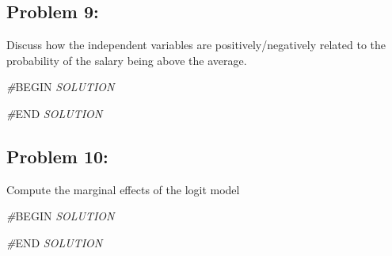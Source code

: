 \documentclass[
]{article}
\newenvironment{Shaded}{\begin{snugshade}}{\end{snugshade}}
\newcommand{\CommentTok}[1]{\textcolor[rgb]{0.56,0.35,0.01}{\textit{#1}}}
\newcommand{\RegionMarkerTok}[1]{#1}
\begin{document}
\hypertarget{problem-9}{%
\subsection{Problem 9:}\label{problem-9}}

Discuss how the independent variables are positively/negatively related
to the probability of the salary being above the average.

\begin{Shaded}
\begin{Highlighting}[]
\CommentTok{\#}\RegionMarkerTok{BEGIN}\CommentTok{ SOLUTION}

\CommentTok{\#}\RegionMarkerTok{END}\CommentTok{ SOLUTION}
\end{Highlighting}
\end{Shaded}

\hypertarget{problem-10}{%
\subsection{Problem 10:}\label{problem-10}}

Compute the marginal effects of the logit model

\begin{Shaded}
\begin{Highlighting}[]
\CommentTok{\#}\RegionMarkerTok{BEGIN}\CommentTok{ SOLUTION}

\CommentTok{\#}\RegionMarkerTok{END}\CommentTok{ SOLUTION}
\end{Highlighting}
\end{Shaded}
\end{document}
